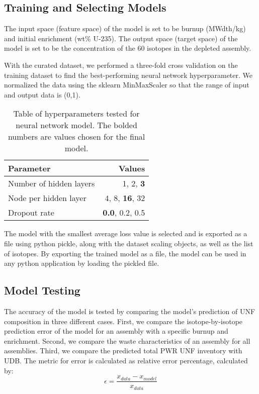 \subsection{Training and Selecting Models}

The input space (feature space) of the model is set to
be burnup (MWdth/kg) and initial enrichment (wt\% U-235).
The output space (target space) of the model is set to
be the concentration of the 60 isotopes in the
depleted assembly.

With the curated dataset, we performed a three-fold
cross validation on the training dataset to find the
best-performing neural network hyperparameter. We
normalized the data using the sklearn MinMaxScaler
so that the range of input and output data is (0,1).

\begin{table}[h]
    \centering
    \begin{tabular}{lr}
        \hline
        Parameter & Values \\
        \hline
        Number of hidden layers & 1, 2, \textbf{3} \\
        Node per hidden layer & 4, 8, \textbf{16}, 32 \\
        Dropout rate & \textbf{0.0}, 0.2, 0.5 \\
        \hline
    \end{tabular}
    \caption{Table of hyperparameters tested
             for neural network model. The bolded
             numbers are values chosen for the final model.}
\end{table}

The model with the smallest average loss value
is selected and is exported as a file using python
pickle, along with the dataset scaling objects, as well as
the list of isotopes. By exporting the trained model
as a file, the model can be used in any python
application by loading the pickled file.


\subsection{Model Testing}

The accuracy of the model is tested by comparing
the model's prediction of \gls{UNF} composition
in three different cases. First, we compare the
isotope-by-isotope prediction error of the model for an
assembly with a specific burnup and enrichment.
Second, we compare the waste characteristics of
an assembly for all assemblies. Third, we compare
the predicted total \gls{PWR} \gls{UNF} inventory with
\gls{UDB}. The metric for error is calculated as
relative error percentage, calculated by:
\begin{equation}
\epsilon = \frac{x_{data} - x_{model}}{x_{data}}
\end{equation}


